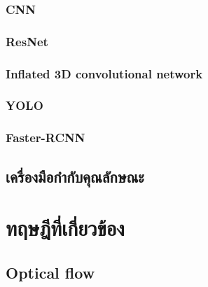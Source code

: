 \subsubsection*{CNN}

\clearpage

\subsubsection*{ResNet}


\clearpage
\subsubsection*{Inflated 3D convolutional network}

\clearpage

\subsubsection*{YOLO}

\clearpage

\subsubsection*{Faster-RCNN}

\clearpage


\subsection{เครื่องมือกำกับคุณลักษณะ}


\clearpage
%
%
%

\section{ทฤษฎีที่เกี่ยวข้อง}
\subsection{Optical flow}

\clearpage
%




